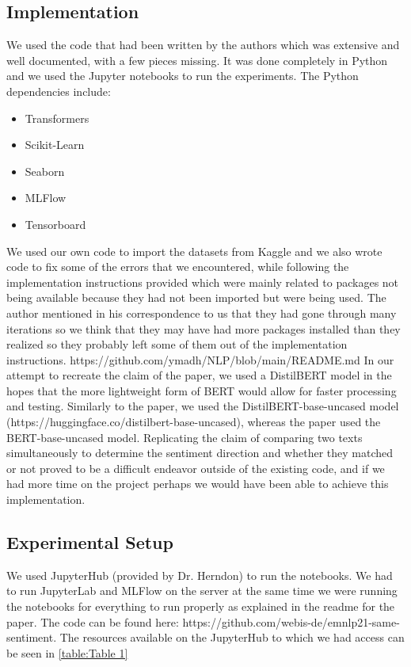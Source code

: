 \documentclass[conference]{IEEEtran}
\begin{document}
\subsection{Implementation}
	We used the code\cite{source-repo} that had been written by the authors which was extensive and well documented, with a few pieces missing. It was done completely in Python and we used the Jupyter notebooks to run the experiments.
The Python dependencies include: 
\begin{itemize}
	\item{Transformers}
	\item{Scikit-Learn}
	\item{Seaborn}
	\item{MLFlow}
	\item{Tensorboard}
\end{itemize}
	We used our own code to import the datasets from Kaggle and we also wrote code to fix some of the errors that we encountered, while following the implementation instructions provided which were mainly related to packages not being available because they had not been imported but were being used.  The author mentioned in his correspondence to us that they had gone through many iterations so we think that they may have had more packages installed than they realized so they probably left some of them out of the implementation instructions.
https://github.com/ymadh/NLP/blob/main/README.md
	In our attempt to recreate the claim of the paper, we used a DistilBERT model in the hopes that the more lightweight form of BERT would allow for faster processing and testing. Similarly to the paper, we used the DistilBERT-base-uncased model (https://huggingface.co/distilbert-base-uncased), whereas the paper used the BERT-base-uncased model. Replicating the claim of comparing two texts simultaneously to determine the sentiment direction and whether they matched or not proved to be a difficult endeavor outside of the existing code, and if we had more time on the project perhaps we would have been able to achieve this implementation.

\subsection{Experimental Setup}
	We used JupyterHub (provided by Dr. Herndon) to run the notebooks. We had to run JupyterLab and MLFlow on the server at the same time we were running the notebooks for everything to run properly as explained in the readme for the paper.
The code can be found here: https://github.com/webis-de/emnlp21-same-sentiment. 
The resources available on the JupyterHub to which we had access can be seen in  \ref{table:Table 1}
\end{document}
